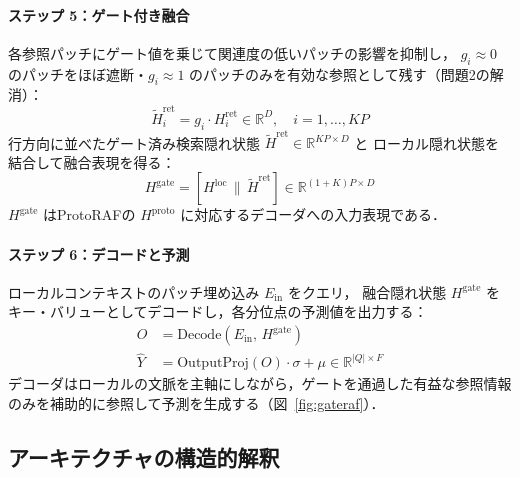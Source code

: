 \documentclass[twocolumn, lastpage]{jarticle}
\begin{document}
    \paragraph{ステップ 5：ゲート付き融合}
    各参照パッチにゲート値を乗じて関連度の低いパッチの影響を抑制し，
    $g_i \approx 0$ のパッチをほぼ遮断・$g_i \approx 1$ のパッチのみを有効な参照として残す（問題2の解消）：
        \begin{equation}
            \tilde{H}^{\mathrm{ret}}_i = g_i \cdot H^{\mathrm{ret}}_i \in \mathbb{R}^{D},
            \quad i = 1, \ldots, KP
        \end{equation}
    行方向に並べたゲート済み検索隠れ状態 $\tilde{H}^{\mathrm{ret}} \in \mathbb{R}^{KP \times D}$ と
    ローカル隠れ状態を結合して融合表現を得る：
        \begin{equation}
            H^{\mathrm{gate}} = \left[H^{\mathrm{loc}} \,\|\, \tilde{H}^{\mathrm{ret}}\right]
            \in \mathbb{R}^{(1+K)P \times D}
        \end{equation}
    $H^{\mathrm{gate}}$ はProtoRAFの $H^{\mathrm{proto}}$ に対応するデコーダへの入力表現である．

    \paragraph{ステップ 6：デコードと予測}
    ローカルコンテキストのパッチ埋め込み $E_{\mathrm{in}}$ をクエリ，
    融合隠れ状態 $H^{\mathrm{gate}}$ をキー・バリューとしてデコードし，各分位点の予測値を出力する：
        \begin{align}
            O &= \mathrm{Decode}(E_{\mathrm{in}},\, H^{\mathrm{gate}}) \\
            \hat{Y} &= \mathrm{OutputProj}(O) \cdot \sigma + \mu \in \mathbb{R}^{|Q| \times F}
        \end{align}
    デコーダはローカルの文脈を主軸にしながら，ゲートを通過した有益な参照情報のみを補助的に参照して予測を生成する（図~\ref{fig:gateraf}）．





\subsection{アーキテクチャの構造的解釈}
\end{document}
